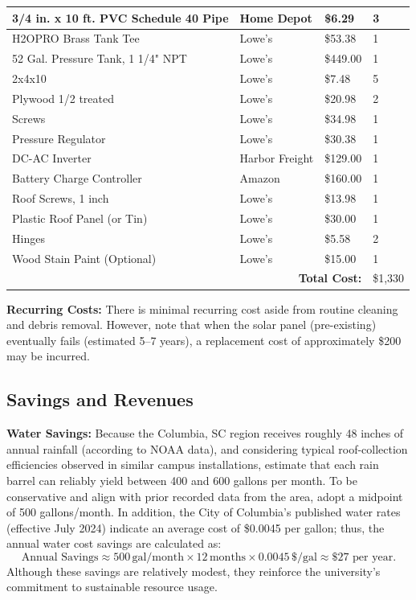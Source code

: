\documentclass[12pt]{report}
\begin{document}
\begin{longtable}{|p{8cm}|p{2.5cm}|p{2cm}|p{1cm}|}
3/4 in. x 10 ft. PVC Schedule 40 Pipe & Home Depot & \$6.29 & 3 \\ \hline
H2OPRO Brass Tank Tee & Lowe's & \$53.38 & 1 \\ \hline
52 Gal. Pressure Tank, 1 1/4" NPT & Lowe's & \$449.00 & 1 \\ \hline
2x4x10 & Lowe's & \$7.48 & 5 \\ \hline
Plywood 1/2 treated & Lowe's & \$20.98 & 2 \\ \hline
Screws & Lowe's & \$34.98 & 1 \\ \hline
Pressure Regulator & Lowe's & \$30.38 & 1 \\ \hline
DC-AC Inverter & Harbor Freight & \$129.00 & 1 \\ \hline
Battery Charge Controller & Amazon & \$160.00 & 1 \\ \hline
Roof Screws, 1 inch & Lowe's & \$13.98 & 1 \\ \hline
Plastic Roof Panel (or Tin) & Lowe's & \$30.00 & 1 \\ \hline
Hinges & Lowe's & \$5.58 & 2 \\ \hline
Wood Stain Paint (Optional) & Lowe's & \$15.00 & 1 \\ \hline
\multicolumn{3}{|r|}{\textbf{Total Cost:}} & \$1,330 \\ \hline
\end{longtable}


\noindent\textbf{Recurring Costs:}  
There is minimal recurring cost aside from routine cleaning and debris removal. However, note that when the solar panel (pre-existing) eventually fails (estimated 5--7 years), a replacement cost of approximately \$200 may be incurred.

\subsection{Savings and Revenues}

\textbf{Water Savings:}  
Because the Columbia, SC region receives roughly 48 inches of annual rainfall (according to NOAA data), and considering typical roof-collection efficiencies observed in similar campus installations, estimate that each rain barrel can reliably yield between 400 and 600 gallons per month. To be conservative and align with prior recorded data from the area, adopt a midpoint of 500 gallons/month. In addition, the City of Columbia’s published water rates (effective July 2024) indicate an average cost of \$0.0045 per gallon; thus, the annual water cost savings are calculated as:
\[
\text{Annual Savings} \approx 500\,\text{gal/month} 
\times 12\,\text{months} 
\times 0.0045\,\$/\text{gal} 
\approx \$27 \text{ per year.}
\]
Although these savings are relatively modest, they reinforce the university’s commitment to sustainable resource usage.
\end{document}
